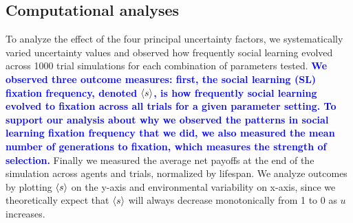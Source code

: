 \documentclass[letterpaper,11.5pt]{scrartcl}
\newcommand{\edit}[1]{{\bfseries \textcolor{blue} {#1}}}
\begin{document}
\subsection{Computational analyses}
\label{ssec:computationalAnalyses}


To analyze the effect of the four principal uncertainty factors, we systematically
varied uncertainty values %
and observed how frequently social learning evolved across 1000 trial simulations for each combination of parameters tested. %
\edit{We observed three outcome measures: first, the social learning (SL) fixation frequency, denoted $\langle s \rangle$, is how frequently social learning evolved to fixation across all trials for a given parameter setting. To support our analysis about why we observed the patterns in social learning fixation frequency that we did, we also measured the mean number of generations to fixation, which measures the strength of selection.} Finally we measured the average net payoffs at the end of the simulation across agents and trials, normalized by lifespan. We analyze
outcomes by plotting $\langle s \rangle$ on the y-axis and environmental variability on
x-axis, since we theoretically expect that $\langle s \rangle$ will always decrease monotonically from 1 to 0 as $u$ increases. %
\end{document}
